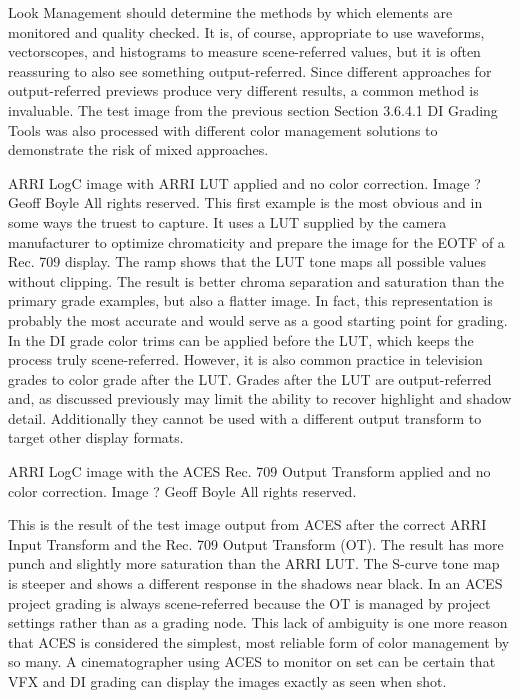 Look Management should determine the methods by which elements are monitored and quality checked. It is, of course, appropriate to use waveforms, vectorscopes, and histograms to measure scene-referred values, but it is often reassuring to also see something output-referred. Since different approaches for output-referred previews produce very different results, a common method is invaluable. The test image from the previous section Section 3.6.4.1 DI Grading Tools was also processed with different color management solutions to demonstrate the risk of mixed approaches.


ARRI LogC image with ARRI LUT applied and no color correction.  Image ? Geoff Boyle All rights reserved.
This first example is the most obvious and in some ways the truest to capture. It uses a LUT supplied by the camera manufacturer to optimize chromaticity and prepare the image for the EOTF of a Rec. 709 display. The ramp shows that the LUT tone maps all possible values without clipping. The result is better chroma separation and saturation than the primary grade examples, but also a flatter image. In fact, this representation is probably the most accurate and would serve as a good starting point for grading. In the DI grade color trims can be applied before the LUT, which keeps the process truly scene-referred. However, it is also common practice in television grades to color grade after the LUT. Grades after the LUT are output-referred and, as discussed previously may limit the ability to recover highlight and shadow detail. Additionally they cannot be used with a different output transform to target other display formats.


ARRI LogC image with the ACES Rec. 709 Output Transform applied and no color correction.  Image ? Geoff Boyle All rights reserved.


This is the result of the test image output from ACES after the correct ARRI Input Transform and the Rec. 709 Output Transform (OT). The result has more punch and slightly more saturation than the ARRI LUT. The S-curve tone map is steeper and shows a different response in the shadows near black. In an ACES project grading is always scene-referred because the OT is managed by project settings rather than as a grading node. This lack of ambiguity is one more reason that ACES is considered the simplest, most reliable form of color management by so many. A cinematographer using ACES to monitor on set can be certain that VFX and DI grading can display the images exactly as seen when shot.


